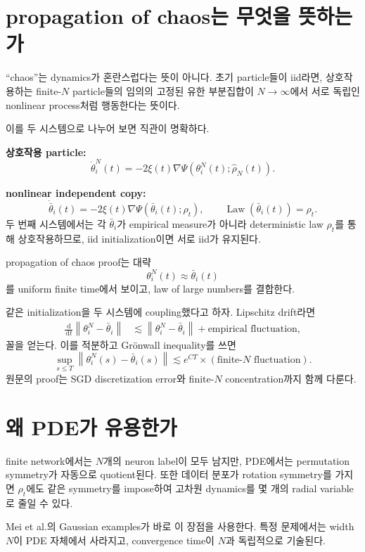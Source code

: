 \documentclass[11pt,a4paper,oneside,openany]{memoir}
\newcommand{\grad}{\nabla}
\newcommand{\dd}{\,\mathrm{d}}
\newcommand{\norm}[1]{\left\lVert #1\right\rVert}
\newcommand{\Law}{\operatorname{Law}}
\theoremstyle{definition}
\begin{document}
\section{propagation of chaos는 무엇을 뜻하는가}

``chaos''는 dynamics가 혼란스럽다는 뜻이 아니다. 초기 particle들이 iid라면,
상호작용하는 finite-$N$ particle들의 임의의 고정된 유한 부분집합이 $N\to\infty$에서
서로 독립인 nonlinear process처럼 행동한다는 뜻이다.

이를 두 시스템으로 나누어 보면 직관이 명확하다.

\textbf{상호작용 particle:}
\[
  \dot\theta_i^N(t)
  =-2\xi(t)\grad\Psi(\theta_i^N(t);\hat\rho_N(t)).
\]

\textbf{nonlinear independent copy:}
\[
  \dot{\bar\theta}_i(t)
  =-2\xi(t)\grad\Psi(\bar\theta_i(t);\rho_t),
  \qquad \Law(\bar\theta_i(t))=\rho_t.
\]
두 번째 시스템에서는 각 $\bar\theta_i$가 empirical measure가 아니라 deterministic law $\rho_t$를
통해 상호작용하므로, iid initialization이면 서로 iid가 유지된다.

propagation of chaos proof는 대략
\[
  \theta_i^N(t)\approx\bar\theta_i(t)
\]
를 uniform finite time에서 보이고, law of large numbers를 결합한다.

\begin{suppbox}
같은 initialization을 두 시스템에 coupling했다고 하자. Lipschitz drift라면
\begin{align*}
\frac{\dd}{\dd t}\norm{\theta_i^N-\bar\theta_i}
&\lesssim
\norm{\theta_i^N-\bar\theta_i}
+\text{empirical fluctuation},
\end{align*}
꼴을 얻는다. 이를 적분하고 Grönwall inequality를 쓰면
\[
  \sup_{s\le T}\norm{\theta_i^N(s)-\bar\theta_i(s)}
  \lesssim e^{CT}\times(\text{finite-}N\text{ fluctuation}).
\]
원문의 proof는 SGD discretization error와 finite-$N$ concentration까지 함께 다룬다.
\end{suppbox}

\section{왜 PDE가 유용한가}

finite network에서는 $N$개의 neuron label이 모두 남지만, PDE에서는 permutation symmetry가 자동으로
quotient된다. 또한 데이터 분포가 rotation symmetry를 가지면 $\rho_t$에도 같은 symmetry를 impose하여
고차원 dynamics를 몇 개의 radial variable로 줄일 수 있다.

Mei et al.의 Gaussian examples가 바로 이 장점을 사용한다. 특정 문제에서는 width $N$이 PDE 자체에서
사라지고, convergence time이 $N$과 독립적으로 기술된다.
\end{document}
